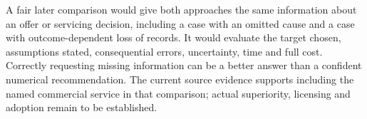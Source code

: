 A fair later comparison would give both approaches the same information about
an offer or servicing decision, including a case with an omitted cause and a
case with outcome-dependent loss of records. It would evaluate the target
chosen, assumptions stated, consequential errors, uncertainty, time and full
cost. Correctly requesting missing information can be a better answer than a
confident numerical recommendation. The current source evidence supports
including the named commercial service in that comparison; actual superiority,
licensing and adoption remain to be established.
